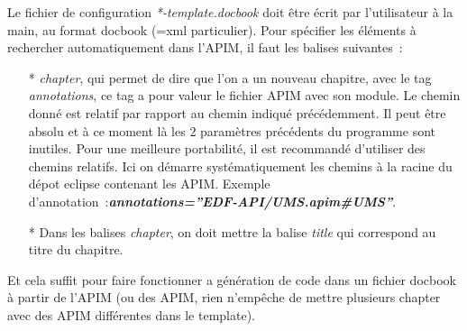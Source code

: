 \documentclass{article}
\begin{document}
Le fichier de configuration \textit{*-template.docbook} doit \^etre \'ecrit par l'utilisateur \`a la main, au format docbook (=xml particulier). Pour sp\'ecifier les \'el\'ements \`a rechercher automatiquement dans l'APIM, il faut les balises suivantes~:
\begin{itemize}
\item[*] \textit{chapter}, qui permet de dire que l'on a un nouveau chapitre, avec le tag \textit{annotations}, ce tag a pour valeur le fichier APIM avec son module. Le chemin donn\'e est relatif par rapport au chemin indiqu\'e pr\'ec\'edemment. Il peut \^etre absolu et \`a ce moment l\`a les 2 param\`etres pr\'ec\'edents du programme sont inutiles. Pour une meilleure portabilit\'e, il est recommand\'e d'utiliser des chemins relatifs. Ici on d\'emarre syst\'ematiquement les chemins \`a la racine du d\'epot eclipse contenant les APIM. Exemple d'annotation~:\textit{\textbf{annotations=''EDF-API/UMS.apim\#UMS''}}.
\item[*] Dans les balises \textit{chapter}, on doit mettre la balise \textit{title} qui correspond au titre du chapitre.
\end{itemize}
Et cela suffit pour faire fonctionner a g\'en\'eration de code dans un fichier docbook \`a partir de l'APIM (ou des APIM, rien n'emp\^eche de mettre plusieurs chapter avec des APIM diff\'erentes dans le template).
\end{document}
